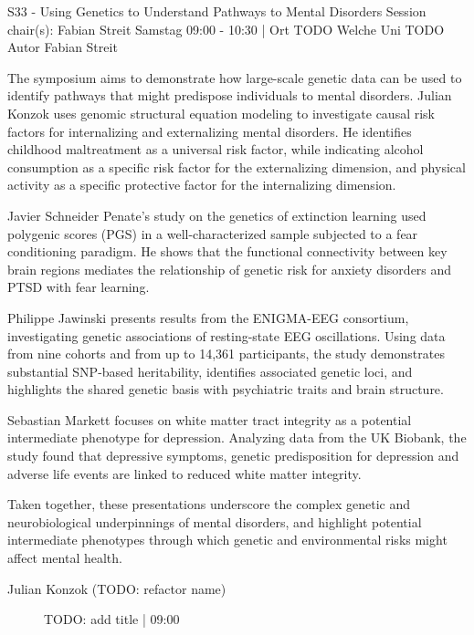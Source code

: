
            \begin{symposium}
            {S33 - Using Genetics to Understand Pathways to Mental Disorders}
            {Session chair(s): Fabian Streit}
            {Samstag 09:00 - 10:30 | Ort TODO}
            {Welche Uni TODO}
            Autor Fabian Streit

The symposium aims to demonstrate how large-scale genetic data can be used to identify pathways that might predispose individuals to mental disorders.
Julian Konzok uses genomic structural equation modeling to investigate causal risk factors for internalizing and externalizing mental disorders. He identifies childhood maltreatment as a universal risk factor, while indicating alcohol consumption as a specific risk factor for the externalizing dimension, and physical activity as a specific protective factor for the internalizing dimension.

Javier Schneider Penate's study on the genetics of extinction learning used polygenic scores (PGS) in a well-characterized sample subjected to a fear conditioning paradigm. He shows that the functional connectivity between key brain regions mediates the relationship of genetic risk for anxiety disorders and PTSD with fear learning.

Philippe Jawinski presents results from the ENIGMA-EEG consortium, investigating genetic associations of resting-state EEG oscillations. Using data from nine cohorts and from up to 14,361 participants, the study demonstrates substantial SNP-based heritability, identifies associated genetic loci, and highlights the shared genetic basis with psychiatric traits and brain structure.

Sebastian Markett focuses on white matter tract integrity as a potential intermediate phenotype for depression. Analyzing data from the UK Biobank, the study found that depressive symptoms, genetic predisposition for depression and adverse life events are linked to reduced white matter integrity.

Taken together, these presentations underscore the complex genetic and neurobiological underpinnings of mental disorders, and highlight potential intermediate phenotypes through which genetic and environmental risks might affect mental health.
            \begin{description}    
            
                \item [Julian Konzok (TODO: refactor name)] TODO: add title \textcolor{mygray}{ | 09:00}    
                

\end{description}
\end{symposium}
